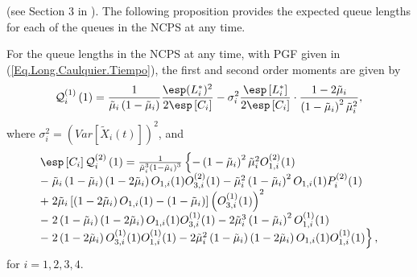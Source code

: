 (see Section 3 in \cite{Takagi}). The following proposition provides the expected queue lengths for each of the queues in the NCPS at any time.
\begin{Teo}
For the queue lengths in the NCPS at any time, with PGF given in (\ref{Eq.Long.Caulquier.Tiempo}), the first and second order moments are given by
\begin{eqnarray}
\mathcal{Q}_{i}^{(1)}\left(1\right)=\frac{1}{\tilde{\mu}_{i}\left(1-\tilde{\mu}_{i}\right)}\frac{\esp (L_{i}^{*})^{2}}{2\esp\left[C_{i}\right]}
-\sigma_{i}^{2}\frac{\esp\left[L_{i}^{*}\right]}{2\esp \left[C_{i}\right]}\cdot\frac{1-2\tilde{\mu}_{i}}{\left(1-\tilde{\mu}_{i}\right)^{2}\tilde{\mu}_{i}^{2}},
\end{eqnarray}
where $\sigma_{i}^{2}=\left(Var\left[\tilde{X}_{i}\left(t\right)\right]\right)^{2}$, and 
\begin{eqnarray}
\begin{array}{l}
\esp\left[C_{i}\right]\mathcal{Q}_{i}^{(2)}\left(1\right)=\frac{1}{\tilde{\mu}_{i}^{3}\left(1-\tilde{\mu}_{i}\right)^{3}}\left\{
-\left(1-\tilde{\mu}_{i}\right)^{2}\tilde{\mu}_{i}^{2}O_{1,i}^{(2)}(1)\right.\\
-\left.\tilde{\mu}_{i}\left(1-\tilde{\mu}_{i}\right)\left(1-2\tilde{\mu}_{i}\right)O_{1,i}(1)O_{3,i}^{(2)}(1)
-\tilde{\mu}_{i}^{2}\left(1-\tilde{\mu}_{i}\right)^{2}O_{1,i}(1)P_{i}^{(2)}(1)\right.\\
+\left.2\tilde{\mu}_{i}\left[\left(1-2\tilde{\mu}_{i}\right)O_{1,i}(1)-\left(1-\tilde{\mu}_{i}\right)\right]\left(O_{3,i}^{(1)}(1)\right)^{2}
\right.\\-\left.
2\left(1-\tilde{\mu}_{i}\right)\left(1-2\tilde{\mu}_{i}\right)O_{1,i}(1)O_{3,i}^{(1)}(1)
-2\tilde{\mu}_{i}^{3}\left(1-\tilde{\mu}_{i}\right)^{2}O_{1,i}^{(1)}(1)
\right.\\-\left.
2\left(1-2\tilde{\mu}_{i}\right)O_{3,i}^{(1)}(1)O_{1,i}^{(1)}(1)
-2\tilde{\mu}_{i}^{2}\left(1-\tilde{\mu}_{i}\right)\left(1-2\tilde{\mu}_{i}\right)O_{1,i}(1)O_{1,i}^{(1)}(1)\right\},
\end{array}
\end{eqnarray}
for $i=1,2,3,4$. 
\end{Teo}
